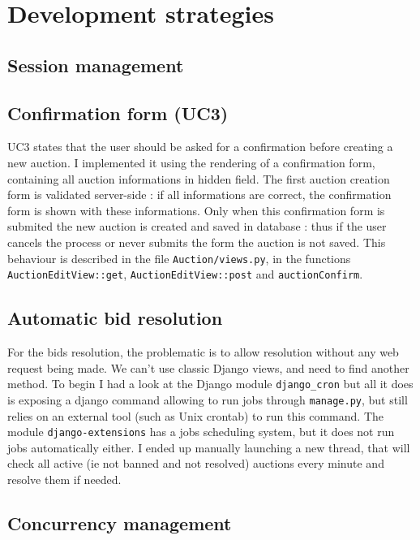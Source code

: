 \documentclass[a4paper, 11pt]{report}
\begin{document}
\chapter{Development strategies}

    \section{Session management}

    \section{Confirmation form (UC3)}

    UC3 states that the user should be asked for a confirmation before creating a new auction. I implemented it using the rendering of a confirmation form, containing all auction informations in hidden field. The first auction creation form is validated server-side : if all informations are correct, the confirmation form is shown with these informations. Only when this confirmation form is submited the new auction is created and saved in database : thus if the user cancels the process or never submits the form the auction is not saved. This behaviour is described in the file \texttt{Auction/views.py}, in the functions \texttt{AuctionEditView::get}, \texttt{AuctionEditView::post} and \texttt{auctionConfirm}. 

    \section{Automatic bid resolution}

    For the bids resolution, the problematic is to allow resolution without any web request being made. We can't use classic Django views, and need to find another method. To begin I had a look at the Django module \texttt{django\_cron} but all it does is exposing a django command allowing to run jobs through \texttt{manage.py}, but still relies on an external tool (such as Unix crontab) to run this command. The module \texttt{django-extensions} has a jobs scheduling system, but it does not run jobs automatically either. I ended up manually launching a new thread, that will check all active (ie not banned and not resolved) auctions every minute and resolve them if needed. 
        
    \section{Concurrency management}
\end{document}
